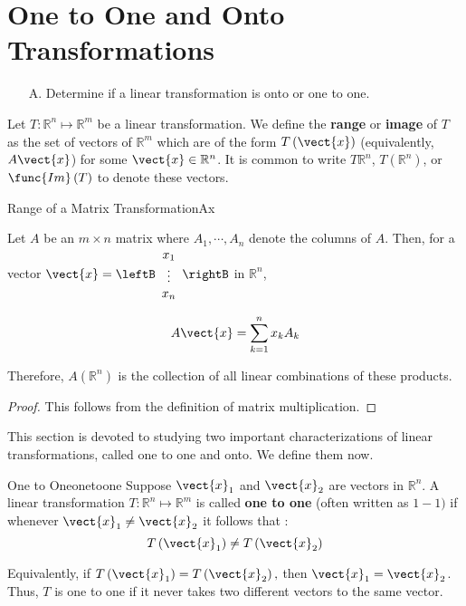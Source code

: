 \section{One to One and Onto Transformations}

\begin{outcome}
\begin{enumerate}
\item[A.]  Determine if a linear transformation is onto or one to one.
\end{enumerate}
\end{outcome}

Let $T: \mathbb{R}^n \mapsto \mathbb{R}^m$ be a linear transformation. We define the \textbf{range} or \textbf{image} of $T$ as the set of vectors of $\mathbb{R}^{m}$ which are of the form
$T \left(\vect{x}\right)$ (equivalently, $A\vect{x}$) for some $\vect{x}\in \mathbb{R}^{n}$. It is common
to write $T\mathbb{R}^{n}$, $T\left( \mathbb{R}^{n}\right)$, or
$\func{Im}\left( T\right) $ to denote these vectors.  

\begin{lemma}{Range of a Matrix Transformation}{Ax}

Let $A$ be an $m\times n$ matrix where $A_{1},\cdots , A_{n}$ denote the columns of
$A$. Then, for a vector $\vect{x}=\leftB 
\begin{array}{c}
x_{1} \\
\vdots \\
 x_{n}
\end{array}
\rightB$ in $\mathbb{R}^n$,

\begin{equation*}
A\vect{x}=\sum_{k=1}^{n}x_{k}A_{k}
\end{equation*}

Therefore, $A \left( \mathbb{R}^n \right)$ is the collection of all
linear combinations of these products.
\end{lemma}

\begin{proof}
This follows from the definition of matrix multiplication.
\end{proof}

This section is devoted to studying two important characterizations of linear transformations, called one to one and onto. We define them now. 

\begin{definition}{One to One}{onetoone}
Suppose $\vect{x}_1$ and $\vect{x}_2$ are vectors in $\mathbb{R}^n$. A linear transformation $T: \mathbb{R}^n \mapsto \mathbb{R}^m$ is called \textbf{one to one} (often written as $1-1)$ if whenever
 $\vect{x}_1 \neq \vect{x}_2$ it follows that :
\begin{equation*}
T\left( \vect{x}_1 \right) \neq T \left(\vect{x}_2\right)
\end{equation*}

Equivalently, if $T\left( \vect{x}_1 \right) =T\left( \vect{x}_2\right) ,$
then $\vect{x}_1 = \vect{x}_2$. Thus,  $T$ is one to one if it never takes two different
vectors to the same vector.
\end{definition}

